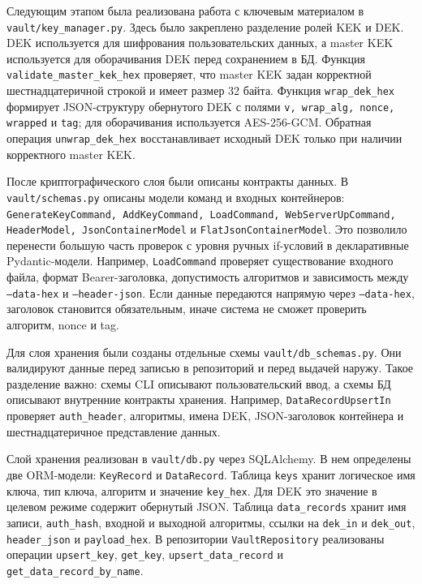 \documentclass[14pt, a4paper]{extarticle}
\begin{document}
	Следующим этапом была реализована работа с ключевым материалом в \texttt{vault/key\_manager.py}. Здесь было закреплено разделение ролей KEK и DEK. DEK используется для шифрования пользовательских данных, а master KEK используется для оборачивания DEK перед сохранением в БД. Функция \texttt{validate\_master\_kek\_hex} проверяет, что master KEK задан корректной шестнадцатеричной строкой и имеет размер 32 байта. Функция \texttt{wrap\_dek\_hex} формирует JSON-структуру обернутого DEK с полями \texttt{v, wrap\_alg, nonce, wrapped} и \texttt{tag}; для оборачивания используется AES-256-GCM. Обратная операция \texttt{unwrap\_dek\_hex} восстанавливает исходный DEK только при наличии корректного master KEK.
		
	После криптографического слоя были описаны контракты данных. В \texttt{vault/schemas.py} описаны модели команд и входных контейнеров: \texttt{GenerateKeyCommand, AddKeyCommand, LoadCommand, WebServerUpCommand, HeaderModel, JsonContainerModel} и \texttt{FlatJsonContainerModel}. Это позволило перенести большую часть проверок с уровня ручных if-условий в декларативные Pydantic-модели. Например, \texttt{LoadCommand} проверяет существование входного файла, формат Bearer-заголовка, допустимость алгоритмов и зависимость между \texttt{--data-hex} и \texttt{--header-json}. Если данные передаются напрямую через \texttt{--data-hex}, заголовок становится обязательным, иначе система не сможет проверить алгоритм, nonce и tag.
	
	Для слоя хранения были созданы отдельные схемы \texttt{vault/db\_schemas.py}. Они валидируют данные перед записью в репозиторий и перед выдачей наружу. Такое разделение важно: схемы CLI описывают пользовательский ввод, а схемы БД описывают внутренние контракты хранения. Например, \texttt{DataRecordUpsertIn} проверяет \texttt{auth\_header}, алгоритмы, имена DEK, JSON-заголовок контейнера и шестнадцатеричное представление данных. 
	
	Слой хранения реализован в \texttt{vault/db.py} через SQLAlchemy. В нем определены две ORM-модели: \texttt{KeyRecord} и \texttt{DataRecord}. Таблица \texttt{keys} хранит логическое имя ключа, тип ключа, алгоритм и значение \texttt{key\_hex}. Для DEK это значение в целевом режиме содержит обернутый JSON. Таблица \texttt{data\_records} хранит имя записи, \texttt{auth\_hash}, входной и выходной алгоритмы, ссылки на \texttt{dek\_in} и \texttt{dek\_out}, \texttt{header\_json} и \texttt{payload\_hex}. В репозитории \texttt{VaultRepository} реализованы операции \texttt{upsert\_key}, \texttt{get\_key}, \texttt{upsert\_data\_record} и \texttt{get\_data\_record\_by\_name}.
	
\end{document}
